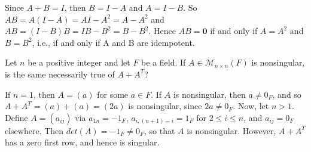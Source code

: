 \smallskip
\begin{solution}

Since $A + B = I$, then $B = I - A$ and $A = I - B$. So $AB = A(I - A) = AI - A^2 = A - A^2$ 
and $AB = (I - B)B = IB - B^2 = B - B^2$. Hence $AB = \mathbf{0}$ if and only if $A = A^2$ and 
$B = B^2$, i.e., if and only if A and B are idempotent.

\end{solution}

\probskip

\begin{ex}[Golan 530]
Let $n$ be a positive integer and let $F$ be a field.  If
$A \in \mathcal{M}_{n\times n}(F)$ is nonsingular, is the same necessarily true
of $A + A^T$?
\end{ex}

\smallskip
\begin{solution}

If $n=1$, then $A=(a)$ for some $a \in F$. If $A$ is nonsingular, then $a \ne 0_F$, and so 
$A + A^T = (a) + (a) = (2a)$ is nonsingular, since $2a \ne 0_F$.
\smallskip
Now, let $n > 1$. Define $A = (a_{ij})$ via $a_{1n} = -1_F$, $a_{i,(n+1)-i} = 1_F$ for $2 \le i \le n$, 
and $a_{ij} = 0_F$ elsewhere. Then $det(A) = -1_F \ne 0_F$, so that $A$ is nonsingular. 
However, $A + A^T$ has a zero first row, and hence is singular.

\end{solution}

%
%


